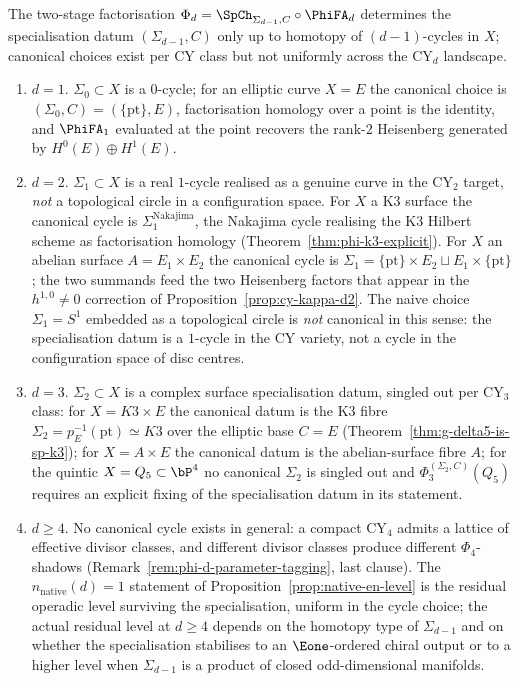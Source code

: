 \begin{remark}
\label{rem:per-d-canonical-cycle}
The two-stage factorisation $\Phi_d = \SpCh_{\Sigma_{d-1}, C} \circ \PhiFA_d$ determines the specialisation datum $(\Sigma_{d-1}, C)$ only up to homotopy of $(d-1)$-cycles in $X$; canonical choices exist per CY class but not uniformly across the CY$_d$ landscape.
\begin{enumerate}[label=\textup{(\roman*)}]
 \item $d = 1$. $\Sigma_0 \subset X$ is a $0$-cycle; for an elliptic curve $X = E$ the canonical choice is $(\Sigma_0, C) = (\{\mathrm{pt}\}, E)$, factorisation homology over a point is the identity, and $\PhiFA_1$ evaluated at the point recovers the rank-$2$ Heisenberg generated by $H^0(E) \oplus H^1(E)$.
 \item $d = 2$. $\Sigma_1 \subset X$ is a real $1$-cycle realised as a genuine curve in the CY$_2$ target, \emph{not} a topological circle in a configuration space. For $X$ a K3 surface the canonical cycle is $\Sigma_1^{\mathrm{Nakajima}}$, the Nakajima cycle realising the K3 Hilbert scheme as factorisation homology (Theorem~\ref{thm:phi-k3-explicit}). For $X$ an abelian surface $A = E_1 \times E_2$ the canonical cycle is $\Sigma_1 = \{\mathrm{pt}\} \times E_2 \sqcup E_1 \times \{\mathrm{pt}\}$; the two summands feed the two Heisenberg factors that appear in the $h^{1,0} \neq 0$ correction of Proposition~\ref{prop:cy-kappa-d2}. The naive choice $\Sigma_1 = S^1$ embedded as a topological circle is \emph{not} canonical in this sense: the specialisation datum is a $1$-cycle in the CY variety, not a cycle in the configuration space of disc centres.
 \item $d = 3$. $\Sigma_2 \subset X$ is a complex surface
 specialisation datum, singled out per CY$_3$ class: for
 $X = K3 \times E$ the canonical datum is the K3 fibre
 $\Sigma_2 = p_E^{-1}(\mathrm{pt}) \simeq K3$ over the elliptic base
 $C=E$ (Theorem~\ref{thm:g-delta5-is-sp-k3}); for $X = A \times E$ the
 canonical datum is the abelian-surface fibre $A$; for the quintic
 $X = Q_5 \subset \bP^4$ no canonical $\Sigma_2$ is singled out and
 $\Phi_3^{(\Sigma_2,C)}(Q_5)$ requires an explicit fixing of the
 specialisation datum in its statement.
 \item $d \geq 4$. No canonical cycle exists in general: a compact CY$_4$ admits a lattice of effective divisor classes, and different divisor classes produce different $\Phi_4$-shadows (Remark~\ref{rem:phi-d-parameter-tagging}, last clause). The $n_{\mathrm{native}}(d) = 1$ statement of Proposition~\ref{prop:native-en-level} is the residual operadic level surviving the specialisation, uniform in the cycle choice; the actual residual level at $d \geq 4$ depends on the homotopy type of $\Sigma_{d-1}$ and on whether the specialisation stabilises to an $\Eone$-ordered chiral output or to a higher level when $\Sigma_{d-1}$ is a product of closed odd-dimensional manifolds.

\end{enumerate}
\end{remark}
